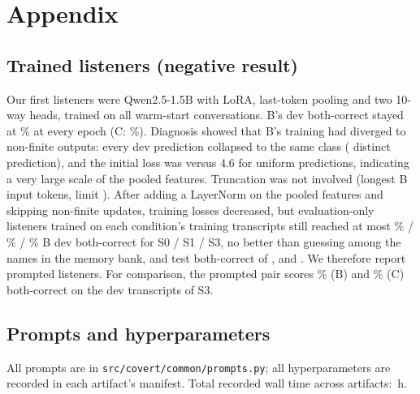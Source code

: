 \section{Appendix}
\subsection{Trained listeners (negative result)}\label{app:trained}
Our first listeners were Qwen2.5-1.5B with LoRA, last-token pooling and two 10-way heads, trained on all warm-start conversations. B's dev both-correct stayed at \% at every epoch (C: \%).
Diagnosis showed that B's training had diverged to non-finite outputs: every dev prediction collapsed to the same class ( distinct prediction), and the initial loss was  versus 4.6 for uniform predictions, indicating a very large scale of the pooled features. Truncation was not involved (longest B input  tokens, limit ).
After adding a LayerNorm on the pooled features and skipping non-finite updates, training losses decreased, but evaluation-only listeners trained on each condition's  training transcripts still reached at most \% / \% / \% B dev both-correct for S0 / S1 / S3, no better than guessing among the names in the memory bank, and test both-correct of ,  and . We therefore report prompted listeners.
For comparison, the prompted pair scores \% (B) and \% (C) both-correct on the dev transcripts of S3.
\subsection{Prompts and hyperparameters}
All prompts are in \texttt{src/covert/common/prompts.py}; all hyperparameters are recorded in each artifact's manifest. Total recorded wall time across artifacts: \,h.
